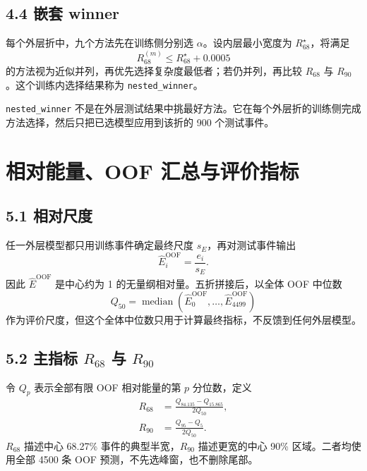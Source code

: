 \documentclass[UTF8,11pt,a4paper,oneside,fontset=none]{ctexart}
\newcommand{\Rsixtyeight}{R_{68}}
\newcommand{\Rninty}{R_{90}}
\newcommand{\OOF}{\mathrm{OOF}}
\begin{document}
\subsection*{4.4 嵌套 winner}

每个外层折中，九个方法先在训练侧分别选 $\alpha$。设内层最小宽度为 $R_{68}^{\star}$，将满足
\begin{equation}
  R_{68}^{(m)}\le R_{68}^{\star}+0.0005
\end{equation}
的方法视为近似并列，再优先选择复杂度最低者；若仍并列，再比较 $\Rsixtyeight$ 与 $\Rninty$。这个训练内选择结果称为 \texttt{nested\_winner}。

\begin{warningbox}[title={避免误解},fonttitle=\bfseries]
\texttt{nested\_winner} 不是在外层测试结果中挑最好方法。它在每个外层折的训练侧完成方法选择，然后只把已选模型应用到该折的 900 个测试事件。
\end{warningbox}

\section{相对能量、OOF 汇总与评价指标}

\subsection*{5.1 相对尺度}

任一外层模型都只用训练事件确定最终尺度 $s_E$，再对测试事件输出
\begin{equation}
  \widehat E_i^{\OOF}
  =\frac{e_i}{s_E}.
\end{equation}
因此 $\widehat E^{\OOF}$ 是中心约为 1 的无量纲相对量。五折拼接后，以全体 OOF 中位数
\begin{equation}
  Q_{50}=\operatorname{median}\!\left(\widehat E_0^{\OOF},\ldots,
  \widehat E_{4499}^{\OOF}\right)
\end{equation}
作为评价尺度，但这个全体中位数只用于计算最终指标，不反馈到任何外层模型。

\subsection*{5.2 主指标 $\Rsixtyeight$ 与 $\Rninty$}

令 $Q_p$ 表示全部有限 OOF 相对能量的第 $p$ 分位数，定义
\begin{align}
  \Rsixtyeight
  &=\frac{Q_{84.135}-Q_{15.865}}{2Q_{50}},\\
  \Rninty
  &=\frac{Q_{95}-Q_{5}}{2Q_{50}}.
\end{align}
$\Rsixtyeight$ 描述中心 68.27\% 事件的典型半宽，$\Rninty$ 描述更宽的中心 90\% 区域。二者均使用全部 4500 条 OOF 预测，不先选峰窗，也不删除尾部。
\end{document}
